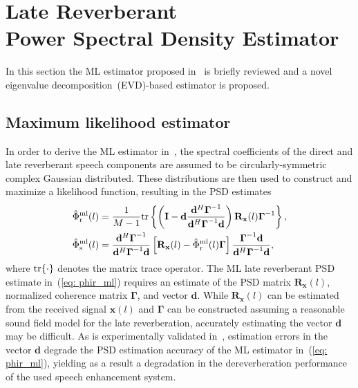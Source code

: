 \documentclass{article}
\begin{document}
\section{Late Reverberant \\ Power Spectral Density Estimator}
In this section the ML estimator proposed in~\cite{Kuklasinski_EUSIPCO_2014g} is briefly reviewed and a novel eigenvalue decomposition~(EVD)-based estimator is proposed.

\subsection{Maximum likelihood estimator}
In order to derive the ML estimator in~\cite{Kuklasinski_EUSIPCO_2014g}, the spectral coefficients of the direct and late reverberant speech  components are assumed to be circularly-symmetric complex Gaussian distributed.
These distributions are then used to construct and maximize a likelihood function, resulting in the PSD estimates
\begin{subequations}
\label{eq: psd_ml}
\begin{align}
\label{eq: phir_ml}
\hat{\Phi}_{\rm r}^{\rm ml}(l) & = \frac{1}{M-1} {\rm tr} \left\{  \left( \mathbf{I} - \mathbf{d} \frac{\mathbf{d}^{H}\boldsymbol{\Gamma}^{-1}}{\mathbf{d}^H\boldsymbol{\Gamma}^{-1}\mathbf{d}} \right) \mathbf{R}_{\mathbf{x}}(l)\boldsymbol{\Gamma}^{-1}\right\}, \\
\hat{\Phi}_{\rm s}^{\rm ml}(l) & = \frac{\mathbf{d}^{H}\boldsymbol{\Gamma}^{-1}}{\mathbf{d}^H\boldsymbol{\Gamma}^{-1}\mathbf{d}} \left[\mathbf{R}_{\mathbf{x}}(l) - \hat{\Phi}_{\rm r}^{\rm ml}(l) \boldsymbol{\Gamma} \right] \frac{\boldsymbol{\Gamma}^{-1}\mathbf{d}}{\mathbf{d}^H\boldsymbol{\Gamma}^{-1}\mathbf{d}},
\end{align}
\end{subequations}
where ${\rm tr}\{ \cdot \}$ denotes the matrix trace operator.
The ML late reverberant PSD estimate in~(\ref{eq: phir_ml}) requires an estimate of the PSD matrix $\mathbf{R}_{\mathbf{x}}(l)$, normalized coherence matrix $\boldsymbol{\Gamma}$, and vector $\mathbf{d}$.
While $\mathbf{R}_{\mathbf{x}}(l)$ can be estimated from the received signal $\mathbf{x}(l)$ and $\boldsymbol{\Gamma}$ can be constructed assuming a reasonable sound field model for the late reverberation, accurately estimating the vector $\mathbf{d}$ may be difficult.
As is experimentally validated in~\cite{kuklasinski_AES_2016}, estimation errors in the vector $\mathbf{d}$ degrade the PSD estimation accuracy of the ML estimator in~(\ref{eq: phir_ml}), yielding as a result a degradation in the dereverberation performance of the used speech enhancement system.
\end{document}
